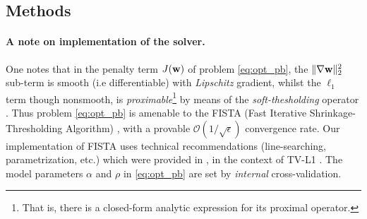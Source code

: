 \subsection{Methods}


\paragraph{A note on implementation of the solver.}
One notes that in the penalty term $J(\mathbf{w})$ of problem
\eqref{eq:opt_pb}, the $\|\nabla
\mathbf{w}\|^2_2$ sub-term is smooth (i.e differentiable) with
\textit{Lipschitz} gradient, whilst the $\ell_{1}$ term though
nonsmooth, is \textit{proximable}\footnote{That is, there is a
  closed-form analytic expression for its proximal operator.} by means
of the \textit{soft-thesholding} operator  \citep{daubechies2004}.  Thus
problem \eqref{eq:opt_pb} is amenable to the FISTA (Fast Iterative
Shrinkage-Thresholding Algorithm)  \citep{beck09fista}, with a provable
$\mathcal{O}(1/\sqrt{\epsilon})$ convergence rate. Our implementation
of FISTA uses technical recommendations
(line-searching, parametrization, etc.) which were provided in
 \citep{dohmatob2014benchmarking}, in the context of TV-L1
 \citep{baldassarre2012,gramfort2013}. The model parameters $\alpha$ and
$\rho$ in \eqref{eq:opt_pb} are set by \textit{internal}
cross-validation.





